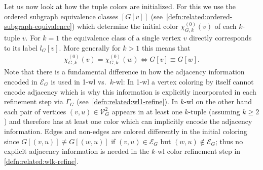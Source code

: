 Let us now look at how the tuple colors are initialized.
For this we use the ordered subgraph equivalence classes $[G[v]]$ (see~\cref{defn:related:ordered-subgraph-equivalence}) which determine the initial color $\chi_{G,k}^{(0)}(v)$ of each $k$-tuple $v$.
For $k = 1$ the equivalence class of a single vertex $v$ directly corresponds to its label $l_G[v]$.
More generally for $k > 1$ this means that
\begin{align}
	\chi_{G,k}^{(0)}(v) = \chi_{G,k}^{(0)}(w) \iff G[v] \equiv G[w] \text{.} \label{eq:related:wlk-init}
\end{align}
Note that there is a fundamental difference in how the adjacency information encoded in $\mathcal{E}_G$ is used in 1-\acs{wl} vs.\ $k$-\acs{wl}:
In 1-\acs{wl} a vertex coloring by itself cannot encode adjacency which is why this information is explicitly incorporated in each refinement step via $\Gamma_G$ (see~\cref{defn:related:wl1-refine}).
In $k$-\acs{wl} on the other hand each pair of vertices $(v, u) \in \mathcal{V}_G^2$ appears in at least one $k$-tuple (assuming $k \geq 2$) and therefore has at least one color which can implicitly encode the adjacency information.
Edges and non-edges are colored differently in the initial coloring since $G[(v, u)] \not\equiv G[(w, u)]$ if $(v, u) \in \mathcal{E}_G$ but $(w, u) \notin \mathcal{E}_G$;
thus no explicit adjacency information is needed in the $k$-\acs{wl} color refinement step in \cref{defn:related:wlk-refine}.

